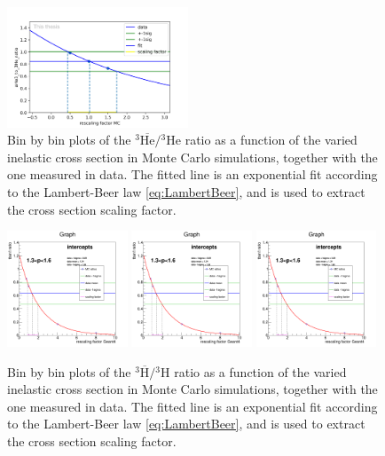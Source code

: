 \begin{figure}
    \includegraphics[width=0.48\textwidth]{figures/he3_rescaling/Bin_7_scaling.png}
    \caption{Bin by bin plots of the $^3\overline{\mathrm{He}}/{^3\mathrm{He}}$ ratio as a function of the varied inelastic cross section in Monte Carlo simulations, together with the one measured in data. The fitted line is an exponential fit according to the Lambert-Beer law \ref{eq:LambertBeer}, and is used to extract the cross section scaling factor.}
    \label{fig:Meth:RatiosAsFunctionsOfSigmaInel3He}
\end{figure}

\begin{figure}
    \centering
    \includegraphics[width=0.32\textwidth]{figures/triton/tbar_Fit_Bin1.png}
    \includegraphics[width=0.32\textwidth]{figures/triton/tbar_Fit_Bin1.png}
    \includegraphics[width=0.32\textwidth]{figures/triton/tbar_Fit_Bin1.png}
    \caption{Bin by bin plots of the $^3\overline{\mathrm{H}}/{^3\mathrm{H}}$ ratio as a function of the varied inelastic cross section in Monte Carlo simulations, together with the one measured in data. The fitted line is an exponential fit according to the Lambert-Beer law \ref{eq:LambertBeer}, and is used to extract the cross section scaling factor.}
    \label{fig:Meth:RatiosAsFunctionsOfSigmaInel3H}
\end{figure}


